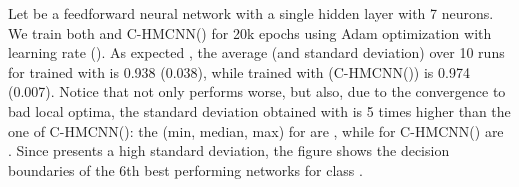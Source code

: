 \documentclass{article}
\newcommand{\loss}{\text{MCLoss}}
\newcommand{\system}[1]{C-HMCNN(#1)}
\newcommand{\auprc}{}
\begin{document}
Let  be a feedforward neural network with a single hidden layer with 7 neurons.  We train both  and \system{} for 20k epochs using Adam optimization with learning rate  (). 
As expected , the average {\auprc} (and standard deviation) over 10 runs for  trained with  is 0.938 (0.038), while  trained with {\loss} (\system{}) is 0.974 (0.007). Notice that not only  performs worse, but also, due to the convergence to bad local optima, the standard deviation obtained with  is 5 times higher than the one of \system{}: the (min, median, max) {\auprc} for  are , while for \system{} are .
Since  presents a high standard deviation, the figure shows the decision boundaries of the 6th best performing networks for class . 
\end{document}
